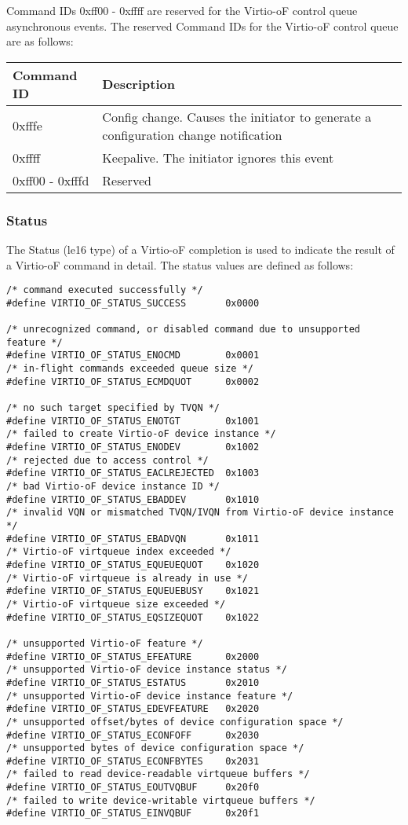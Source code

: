 Command IDs 0xff00 - 0xffff are reserved for the Virtio-oF control queue asynchronous events.
The reserved Command IDs for the Virtio-oF control queue are as follows:

\begin{tabular}{ |l|l| }
\hline
Command ID & Description \\
\hline \hline
0xfffe & Config change. Causes the initiator to generate a configuration change notification \\
\hline
0xffff & Keepalive. The initiator ignores this event \\
\hline
0xff00 - 0xfffd & Reserved \\
\hline
\end{tabular}

\subsubsection{Status}\label{sec:Virtio Transport Options / Virtio Over Fabrics / Commands Definition / Status}
The Status (le16 type) of a Virtio-oF completion is used to indicate the result of a Virtio-oF command in detail.
The status values are defined as follows:

\begin{lstlisting}
/* command executed successfully */
#define VIRTIO_OF_STATUS_SUCCESS       0x0000

/* unrecognized command, or disabled command due to unsupported feature */
#define VIRTIO_OF_STATUS_ENOCMD        0x0001
/* in-flight commands exceeded queue size */
#define VIRTIO_OF_STATUS_ECMDQUOT      0x0002

/* no such target specified by TVQN */
#define VIRTIO_OF_STATUS_ENOTGT        0x1001
/* failed to create Virtio-oF device instance */
#define VIRTIO_OF_STATUS_ENODEV        0x1002
/* rejected due to access control */
#define VIRTIO_OF_STATUS_EACLREJECTED  0x1003
/* bad Virtio-oF device instance ID */
#define VIRTIO_OF_STATUS_EBADDEV       0x1010
/* invalid VQN or mismatched TVQN/IVQN from Virtio-oF device instance */
#define VIRTIO_OF_STATUS_EBADVQN       0x1011
/* Virtio-oF virtqueue index exceeded */
#define VIRTIO_OF_STATUS_EQUEUEQUOT    0x1020
/* Virtio-oF virtqueue is already in use */
#define VIRTIO_OF_STATUS_EQUEUEBUSY    0x1021
/* Virtio-oF virtqueue size exceeded */
#define VIRTIO_OF_STATUS_EQSIZEQUOT    0x1022

/* unsupported Virtio-oF feature */
#define VIRTIO_OF_STATUS_EFEATURE      0x2000
/* unsupported Virtio-oF device instance status */
#define VIRTIO_OF_STATUS_ESTATUS       0x2010
/* unsupported Virtio-oF device instance feature */
#define VIRTIO_OF_STATUS_EDEVFEATURE   0x2020
/* unsupported offset/bytes of device configuration space */
#define VIRTIO_OF_STATUS_ECONFOFF      0x2030
/* unsupported bytes of device configuration space */
#define VIRTIO_OF_STATUS_ECONFBYTES    0x2031
/* failed to read device-readable virtqueue buffers */
#define VIRTIO_OF_STATUS_EOUTVQBUF     0x20f0
/* failed to write device-writable virtqueue buffers */
#define VIRTIO_OF_STATUS_EINVQBUF      0x20f1
\end{lstlisting}

